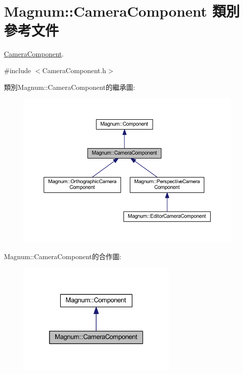 \hypertarget{class_magnum_1_1_camera_component}{}\section{Magnum\+:\+:Camera\+Component 類別 參考文件}
\label{class_magnum_1_1_camera_component}


\hyperlink{class_magnum_1_1_camera_component}{Camera\+Component}.  




{\ttfamily \#include $<$Camera\+Component.\+h$>$}



類別\+Magnum\+:\+:Camera\+Component的繼承圖\+:\nopagebreak
\begin{figure}[H]
\begin{center}
\leavevmode
\includegraphics[width=350pt]{class_magnum_1_1_camera_component__inherit__graph}
\end{center}
\end{figure}


Magnum\+:\+:Camera\+Component的合作圖\+:\nopagebreak
\begin{figure}[H]
\begin{center}
\leavevmode
\includegraphics[width=223pt]{class_magnum_1_1_camera_component__coll__graph}
\end{center}
\end{figure}
